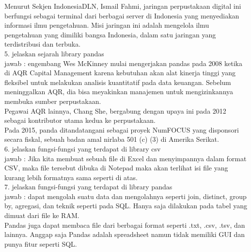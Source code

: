 Menurut Sekjen IndonesiaDLN,  Ismail Fahmi, jaringan perpustakaan digital ini berfungsi sebagai terminal dari berbagai server di Indonesia yang menyediakan informasi ilmu pengetahuan. Misi jaringan ini adalah mengelola ilmu pengetahuan yang dimiliki bangsa Indonesia, dalam satu jaringan yang terdistribusi dan terbuka.\\

5. jelaskan sejarah library pandas\\
jawab : engembang Wes McKinney mulai mengerjakan pandas pada 2008 ketika di AQR Capital Management karena kebutuhan akan alat kinerja tinggi yang fleksibel untuk melakukan analisis kuantitatif pada data keuangan. Sebelum meninggalkan AQR, dia bisa meyakinkan manajemen untuk mengizinkannya membuka sumber perpustakaan.\\

Pegawai AQR lainnya, Chang She, bergabung dengan upaya ini pada 2012 sebagai kontributor utama kedua ke perpustakaan.\\

Pada 2015, panda ditandatangani sebagai proyek NumFOCUS yang disponsori secara fiskal, sebuah badan amal nirlaba 501 (c) (3) di Amerika Serikat.\\

6. jelaskan fungsi-fungsi yang terdapat di library csv\\
jawab : Jika kita membuat sebuah file di Excel dan menyimpannya dalam format CSV, maka file tersebut dibuka di Notepad maka akan terlihat isi file yang kurang lebih formatnya sama seperti di atas.\\

7. jelaskan fungsi-fungsi yang terdapat di library pandas\\
jawab : dapat mengolah suatu data dan mengolahnya seperti join, distinct, group by, agregasi, dan teknik seperti pada SQL. Hanya saja dilakukan pada tabel yang dimuat dari file ke RAM.\\

Pandas juga dapat membaca file dari berbagai format seperti .txt, .csv, .tsv, dan lainnya. Anggap saja Pandas adalah spreadsheet namun tidak memiliki GUI dan punya fitur seperti SQL.\\